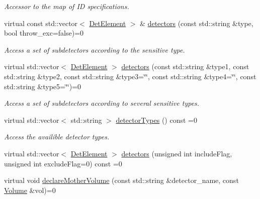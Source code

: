 \begin{DoxyCompactItemize}
\begin{DoxyCompactList}\small\item\em Accessor to the map of ID specifications. \item\end{DoxyCompactList}\item 
virtual const std::vector$<$ \hyperlink{class_d_d4hep_1_1_geometry_1_1_det_element}{DetElement} $>$ \& \hyperlink{class_d_d4hep_1_1_geometry_1_1_l_c_d_d_a0f8e72265d7c6fd7d0dcdd293e13031f}{detectors} (const std::string \&type, bool throw\_\-exc=false)=0
\begin{DoxyCompactList}\small\item\em Access a set of subdetectors according to the sensitive type. \item\end{DoxyCompactList}\item 
virtual std::vector$<$ \hyperlink{class_d_d4hep_1_1_geometry_1_1_det_element}{DetElement} $>$ \hyperlink{class_d_d4hep_1_1_geometry_1_1_l_c_d_d_aee911f853a0e585f0ac9be7852ed6954}{detectors} (const std::string \&type1, const std::string \&type2, const std::string \&type3=\char`\"{}\char`\"{}, const std::string \&type4=\char`\"{}\char`\"{}, const std::string \&type5=\char`\"{}\char`\"{})=0
\begin{DoxyCompactList}\small\item\em Access a set of subdetectors according to several sensitive types. \item\end{DoxyCompactList}\item 
virtual std::vector$<$ std::string $>$ \hyperlink{class_d_d4hep_1_1_geometry_1_1_l_c_d_d_a196cc776b69db52d89f3396bf03d224f}{detectorTypes} () const =0
\begin{DoxyCompactList}\small\item\em Access the availible detector types. \item\end{DoxyCompactList}\item 
virtual std::vector$<$ \hyperlink{class_d_d4hep_1_1_geometry_1_1_det_element}{DetElement} $>$ \hyperlink{class_d_d4hep_1_1_geometry_1_1_l_c_d_d_a1cdc7a631ac397f64b40e7232ee04639}{detectors} (unsigned int includeFlag, unsigned int excludeFlag=0) const =0
\item 
virtual void \hyperlink{class_d_d4hep_1_1_geometry_1_1_l_c_d_d_a6cbadc0074dd9cc3b88b5e0a527586a2}{declareMotherVolume} (const std::string \&detector\_\-name, const \hyperlink{class_d_d4hep_1_1_geometry_1_1_volume}{Volume} \&vol)=0

\end{DoxyCompactItemize}

